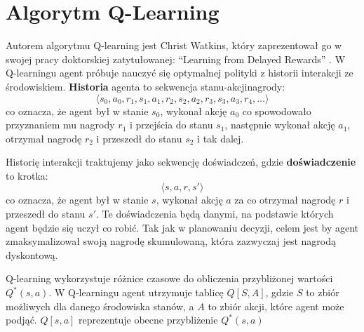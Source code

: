 \documentclass[a4paper, 12pt,oneside]{book}
\begin{document}
\chapter{Algorytm Q-Learning}
\label{chapter:qlearning}
Autorem algorytmu Q-learning jest Christ Watkins, który zaprezentował go w
swojej pracy doktorskiej zatytułowanej: ``Learning from Delayed
Rewards'' \cite{qlearning_inventor}.
W Q-learningu agent próbuje nauczyć się optymalnej polityki z historii
interakcji ze środowiskiem. \textbf{Historia} agenta to sekwencja
stanu-akcji\dywiz nagrody:
\[\langle s_0, a_0, r_1, s_1, a_1, r_2, s_2, a_2, r_3, s_3, a_3, r_4, \dots
\rangle\]
co oznacza, że agent był w stanie $s_0$, wykonał akcję $a_0$ co spowodowało
przyznaniem mu nagrody $r_1$ i przejścia do stanu $s_1$, następnie wykonał
akcję $a_1$, otrzymał nagrodę $r_2$ i przeszedł do stanu $s_2$ i tak dalej.

Historię interakcji traktujemy jako sekwencję doświadczeń, gdzie
\textbf{doświadczenie} to krotka:
\[\langle s, a, r, s' \rangle\]
co oznacza, że agent był w stanie $s$, wykonał akcję $a$ za co otrzymał nagrodę
$r$ i przeszedł do stanu $s'$. Te doświadczenia będą danymi, na podstawie
których agent będzie się uczył co robić. Tak jak w planowaniu decyzji, celem
jest by agent zmaksymalizował swoją nagrodę skumulowaną, która zazwyczaj jest
nagrodą dyskontową.

Q-learning wykorzystuje różnice czasowe do obliczenia przybliżonej wartości
$Q^*(s, a)$. W Q-learningu agent utrzymuje tablicę $Q[S,A]$, gdzie $S$ to zbiór
możliwych dla danego środowiska stanów, a $A$ to zbiór akcji, które agent może
podjąć. $Q[s,a]$ reprezentuje obecne przybliżenie $Q^*(s,a)$
\end{document}
